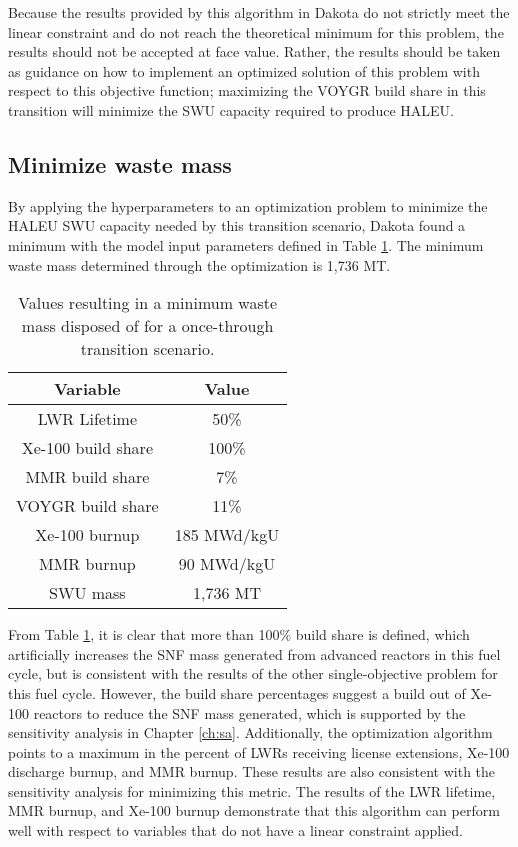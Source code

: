 Because the results provided by this algorithm in Dakota do not strictly 
meet the linear constraint and do not reach the theoretical minimum for 
this problem, the results should not be accepted at face value. 
Rather, the results should be taken as guidance on how to implement an 
optimized solution of this problem 
with respect to this objective function; maximizing the VOYGR build share in 
this transition will minimize the \gls{SWU} capacity required to produce 
\gls{HALEU}.  

\subsection{Minimize waste mass}
By applying the hyperparameters to an optimization problem to minimize the 
\gls{HALEU} \gls{SWU} capacity needed by this transition scenario, Dakota
found a minimum with the model input parameters defined in Table 
\ref{tab:soga_ot_waste}. The minimum waste mass determined through the 
optimization is 1,736 MT. 

\begin{table}[h!]
    \centering 
    \caption{Values resulting in a minimum waste mass disposed of for 
              a once-through transition scenario.}
    \label{tab:soga_ot_waste}
    \begin{tabular}{c c}
        \hline
        Variable & Value \\
        \hline
        LWR Lifetime & 50\%\\
        Xe-100 build share & 100\%\\
        MMR build share & 7\%\\
        VOYGR build share & 11\%\\
        Xe-100 burnup & 185 MWd/kgU\\
        MMR burnup & 90 MWd/kgU\\
        \hline
        SWU mass & 1,736 MT \\
        \hline
    \end{tabular}
\end{table}

From Table \ref{tab:soga_ot_waste}, it is clear that more than 100\% build share
is defined, which artificially increases the \gls{SNF} mass generated from 
advanced reactors in this fuel cycle, but is consistent with the results of 
the other single-objective problem for this fuel cycle. However, the build share 
percentages suggest 
a build out of Xe-100 reactors to reduce the \gls{SNF} mass generated, which 
is supported by the sensitivity analysis in Chapter \ref{ch:sa}. Additionally, 
the optimization algorithm points to a maximum in the percent of \glspl{LWR} 
receiving license extensions, Xe-100 discharge burnup, and \gls{MMR} burnup. 
These results are also consistent with the sensitivity analysis 
for minimizing this metric. The results of the 
\gls{LWR} lifetime, \gls{MMR} burnup, and Xe-100 burnup demonstrate that this 
algorithm can perform well with respect to variables that do not have a 
linear constraint applied. 

